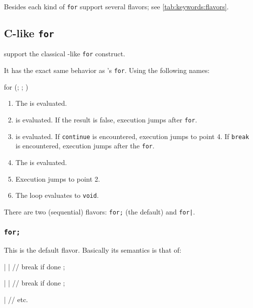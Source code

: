 Besides each kind of \lstinline{for} support several flavors; see
\autoref{tab:keywords:flavors}.

\subsection{C-like \lstinline{for}}
\label{sec:lang:forc}

\us support the classical \langC-like \lstinline{for} construct.


It has the exact same behavior as \langC's \lstinline{for}.  Using the
following names:

\begin{urbiunchecked}
for (; ; )
\end{urbiunchecked}

\begin{enumerate}
\item The  is evaluated.
\item {} is evaluated. If the result is false, execution
  jumps after \lstinline{for}.
\item {} is evaluated. If \lstinline{continue} is encountered,
  execution jumps to point 4. If \lstinline{break} is encountered,
  execution jumps after the \lstinline{for}.
\item The  is evaluated.
\item Execution jumps to point 2.
\item The loop evaluates to \lstinline{void}.
\end{enumerate}

There are two (sequential) flavors: \lstinline{for;} (the default) and
\lstinline{for|}.

\subsubsection{\lstinline{for;}}
\label{sec:lang:forc:semi}
This is the default flavor.  Basically its semantics is that of:

\begin{urbiunchecked}
|
|      // break if done
;

|
|      // break if done
;

|
// etc.
\end{urbiunchecked}

